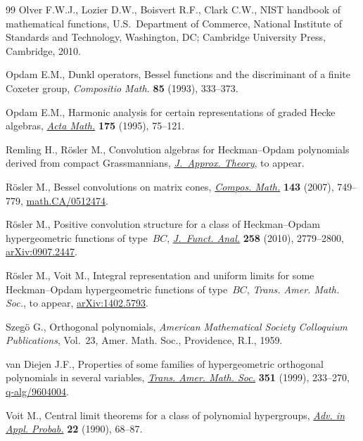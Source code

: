\documentclass[pdftex]{sigma}
\numberwithin{equation}{section}
\begin{document}
\begin{thebibliography}{99}
Olver F.W.J., Lozier D.W., Boisvert R.F., Clark C.W., N{IST} handbook of
  mathematical functions, U.S.~Department of Commerce, National Institute of
  Standards and Technology, Washington, DC; Cambridge University Press,
  Cambridge, 2010.

Opdam E.M., Dunkl operators, {B}essel functions and the discriminant of a
  f\/inite {C}oxeter group, \textit{Compositio Math.} \textbf{85} (1993),
  333--373.

Opdam E.M., Harmonic analysis for certain representations of graded {H}ecke
  algebras, \href{http://dx.doi.org/10.1007/BF02392487}{\textit{Acta Math.}} \textbf{175} (1995), 75--121.

Remling H., R\"osler M., Convolution algebras for Heckman--Opdam polynomials
  derived from compact Grassmannians, \href{http://dx.doi.org/10.1016/j.jat.2014.07.005}{\textit{J.~Approx. Theory}}, {t}o appear.

R{\"o}sler M., Bessel convolutions on matrix cones, \href{http://dx.doi.org/10.1112/S0010437X06002594}{\textit{Compos. Math.}}
  \textbf{143} (2007), 749--779, \href{http://arxiv.org/abs/math.CA/0512474}{math.CA/0512474}.

R{\"o}sler M., Positive convolution structure for a class of {H}eckman--{O}pdam
  hypergeometric functions of type~{$BC$}, \href{http://dx.doi.org/10.1016/j.jfa.2009.12.007}{\textit{J.~Funct. Anal.}}
  \textbf{258} (2010), 2779--2800, \href{http://arxiv.org/abs/0907.2447}{arXiv:0907.2447}.

R\"osler M., Voit M., Integral representation and uniform limits for some
  Heckman--Opdam hypergeometric functions of type~$BC$, \textit{Trans. Amer.
  Math. Soc.}, {t}o appear, \href{http://arxiv.org/abs/1402.5793}{arXiv:1402.5793}.

Szeg{\"o} G., Orthogonal polynomials, \textit{American Mathematical Society
  Colloquium Publications}, Vol.~23, Amer. Math. Soc., Providence, R.I., 1959.

van Diejen J.F., Properties of some families of hypergeometric orthogonal
  polynomials in several variables, \href{http://dx.doi.org/10.1090/S0002-9947-99-02000-0}{\textit{Trans. Amer. Math. Soc.}}
  \textbf{351} (1999), 233--270, \href{http://arxiv.org/abs/q-alg/9604004}{q-alg/9604004}.

Voit M., Central limit theorems for a class of polynomial hypergroups,
  \href{http://dx.doi.org/10.2307/1427597}{\textit{Adv. in Appl. Probab.}} \textbf{22} (1990), 68--87.


\end{thebibliography}
\end{document}
